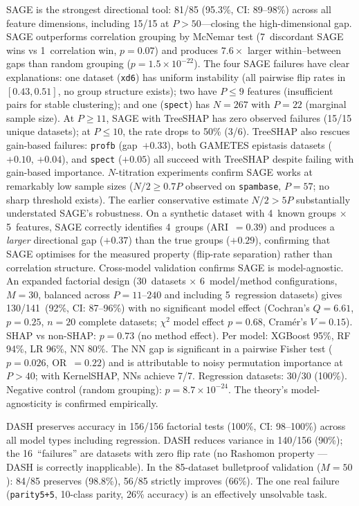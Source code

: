 \documentclass[11pt,a4paper]{article}
\begin{document}
SAGE is the strongest directional tool: 81/85 (95.3\%, CI: 89--98\%)
across all feature dimensions, including 15/15 at $P > 50$---closing
the high-dimensional gap.  SAGE outperforms correlation grouping by
McNemar test (7~discordant SAGE wins vs 1~correlation win, $p = 0.07$)
and produces $7.6\times$ larger within--between gaps than random
grouping ($p = 1.5 \times 10^{-22}$).  The four SAGE failures have
clear explanations: one dataset (\texttt{xd6}) has uniform instability
(all pairwise flip rates in $[0.43, 0.51]$, no group structure exists);
two have $P \leq 9$ features (insufficient pairs for stable clustering);
and one (\texttt{spect}) has $N = 267$ with $P = 22$ (marginal sample
size).  At $P \geq 11$, SAGE with TreeSHAP has zero observed failures
(15/15 unique datasets); at $P \leq 10$, the rate drops to 50\% (3/6).
TreeSHAP also rescues gain-based failures: \texttt{profb} (gap~$+0.33$),
both GAMETES epistasis datasets ($+0.10$, $+0.04$), and \texttt{spect}
($+0.05$) all succeed with TreeSHAP despite failing with gain-based
importance.  $N$-titration experiments confirm SAGE works at remarkably low
sample sizes ($N/2 \geq 0.7P$ observed on \texttt{spambase},
$P = 57$; no sharp threshold exists).  The earlier conservative
estimate $N/2 > 5P$ substantially understated SAGE's robustness.
On a synthetic dataset with 4~known groups $\times$ 5~features,
SAGE correctly identifies 4~groups (ARI~$= 0.39$) and produces a
\emph{larger} directional gap ($+0.37$) than the true groups
($+0.29$), confirming that SAGE optimises for the measured property
(flip-rate separation) rather than correlation structure.
Cross-model validation confirms SAGE is model-agnostic.
An expanded factorial design (30~datasets $\times$ 6~model/method
configurations, $M = 30$, balanced across $P = 11$--$240$ and
including 5~regression datasets) gives 130/141~(92\%, CI: 87--96\%)
with no significant model effect (Cochran's $Q = 6.61$, $p = 0.25$,
$n = 20$ complete datasets; $\chi^2$ model effect $p = 0.68$,
Cram\'er's $V = 0.15$).  SHAP vs non-SHAP: $p = 0.73$ (no method
effect).  Per model: XGBoost 95\%, RF 94\%, LR 96\%, NN 80\%.
The NN gap is significant in a pairwise Fisher test ($p = 0.026$,
OR~$= 0.22$) and is attributable to noisy permutation importance at
$P > 40$; with KernelSHAP, NNs achieve 7/7.  Regression datasets:
30/30 (100\%).  Negative control (random grouping): $p = 8.7 \times
10^{-24}$.  The theory's model-agnosticity is confirmed empirically.

DASH preserves accuracy in 156/156 factorial tests (100\%, CI:
98--100\%) across all model types including regression.  DASH
reduces variance in 140/156 (90\%); the 16~``failures'' are datasets
with zero flip rate (no Rashomon property --- DASH is correctly
inapplicable).  In the 85-dataset bulletproof validation ($M = 50$):
84/85 preserves (98.8\%), 56/85 strictly improves (66\%).  The one
real failure (\texttt{parity5+5}, 10-class parity, 26\% accuracy)
is an effectively unsolvable task.
\end{document}
